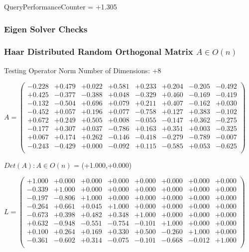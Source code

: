 \documentclass[9pt]{article}
\theoremstyle{plain}
\theoremstyle{definition}
\theoremstyle{remark}
\numberwithin{equation}{section}
\begin{document}
QueryPerformanceCounter  =  +1.305
\subsubsection{Eigen Solver Checks}
\subsubsection{Haar Distributed Random Orthogonal Matrix $A \in O(n)$}
 Testing Operator Norm
Number of Dimensions: +8

$A = \left(
\begin{array}{
cccccccc}
-0.228 & +0.479 & +0.022 & +0.581 & +0.233 & +0.204 & -0.205 & -0.492 \\
+0.425 & -0.377 & -0.388 & +0.048 & -0.329 & +0.460 & -0.169 & -0.419 \\
-0.132 & -0.504 & +0.696 & +0.079 & +0.211 & +0.407 & -0.162 & +0.030 \\
-0.452 & +0.057 & +0.196 & +0.077 & -0.758 & +0.127 & +0.383 & -0.102 \\
+0.672 & +0.249 & +0.505 & +0.008 & -0.055 & -0.147 & +0.362 & -0.275 \\
-0.177 & +0.307 & +0.037 & -0.786 & +0.163 & +0.351 & +0.003 & -0.325 \\
+0.067 & +0.174 & +0.262 & -0.146 & -0.418 & -0.279 & -0.789 & -0.007 \\
-0.243 & -0.429 & +0.000 & -0.092 & +0.115 & -0.585 & +0.053 & -0.625 \\
\end{array}
\right)$ \newline 

$Det(A) :   A \in O(n)$ = (+1.000,+0.000)

$L = \left(
\begin{array}{
cccccccc}
+1.000 & +0.000 & +0.000 & +0.000 & +0.000 & +0.000 & +0.000 & +0.000 \\
-0.339 & +1.000 & +0.000 & +0.000 & +0.000 & +0.000 & +0.000 & +0.000 \\
-0.197 & -0.806 & +1.000 & +0.000 & +0.000 & +0.000 & +0.000 & +0.000 \\
-0.264 & +0.661 & +0.045 & +1.000 & +0.000 & +0.000 & +0.000 & +0.000 \\
-0.673 & +0.398 & +0.482 & +0.348 & +1.000 & +0.000 & +0.000 & +0.000 \\
+0.632 & -0.948 & -0.551 & -0.754 & -0.101 & +1.000 & +0.000 & +0.000 \\
+0.100 & +0.264 & +0.169 & +0.330 & +0.500 & -0.260 & +1.000 & +0.000 \\
-0.361 & -0.602 & +0.314 & -0.075 & -0.101 & -0.668 & -0.012 & +1.000 \\
\end{array}
\right)$ \newline 
\end{document}
